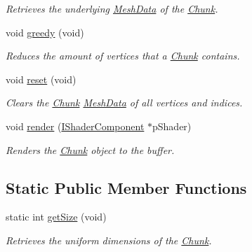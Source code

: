 \begin{DoxyCompactItemize}
\begin{DoxyCompactList}\small\item\em Retrieves the underlying \hyperlink{classsparky_1_1_mesh_data}{Mesh\+Data} of the \hyperlink{classsparky_1_1_chunk}{Chunk}. \end{DoxyCompactList}\item 
void \hyperlink{classsparky_1_1_chunk_a007d463c5ec8c516cc10a6aed31f028e}{greedy} (void)
\begin{DoxyCompactList}\small\item\em Reduces the amount of vertices that a \hyperlink{classsparky_1_1_chunk}{Chunk} contains. \end{DoxyCompactList}\item 
void \hyperlink{classsparky_1_1_chunk_a0d89521b4e322fb1f3b8a031b2f61355}{reset} (void)\hypertarget{classsparky_1_1_chunk_a0d89521b4e322fb1f3b8a031b2f61355}{}\label{classsparky_1_1_chunk_a0d89521b4e322fb1f3b8a031b2f61355}

\begin{DoxyCompactList}\small\item\em Clears the \hyperlink{classsparky_1_1_chunk}{Chunk} \hyperlink{classsparky_1_1_mesh_data}{Mesh\+Data} of all vertices and indices. \end{DoxyCompactList}\item 
void \hyperlink{classsparky_1_1_chunk_a24afefc8aa1fe69218a4e25ce9c06dc2}{render} (\hyperlink{classsparky_1_1_i_shader_component}{I\+Shader\+Component} $\ast$p\+Shader)\hypertarget{classsparky_1_1_chunk_a24afefc8aa1fe69218a4e25ce9c06dc2}{}\label{classsparky_1_1_chunk_a24afefc8aa1fe69218a4e25ce9c06dc2}

\begin{DoxyCompactList}\small\item\em Renders the \hyperlink{classsparky_1_1_chunk}{Chunk} object to the buffer. \end{DoxyCompactList}\end{DoxyCompactItemize}
\subsection*{Static Public Member Functions}
\begin{DoxyCompactItemize}
\item 
static int \hyperlink{classsparky_1_1_chunk_a98fd1c296d3373756675e9a17dcdd622}{get\+Size} (void)
\begin{DoxyCompactList}\small\item\em Retrieves the uniform dimensions of the \hyperlink{classsparky_1_1_chunk}{Chunk}. \end{DoxyCompactList}\end{DoxyCompactItemize}


